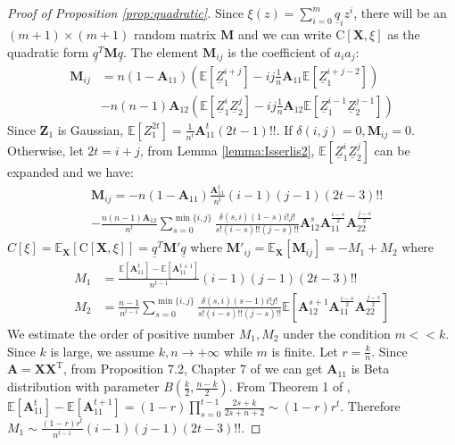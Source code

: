 \documentclass[conference]{IEEEtran}
\def\E{\mathbb{E}}
\def\T{\mathrm{T}}
\begin{document}
\begin{proof}[Proof of Proposition \ref{prop:quadratic}]
Since 
$\xi(z) = \sum_{i=0}^m \underline{q}_i z^i $,
there will be an $(m+1) \times (m+1) $ random matrix $\bm{M}$ and
we can write $\mathrm{C}[\bm{X}, \xi]$
as the quadratic form $ \underline{q}^T \bm{M} \underline{q} $.
The element $\bm{M}_{ij}$ is the coefficient of $a_ia_j$:
\begin{align*}
    \bm{M}_{ij} &= n(1-\bm{A}_{11}) (\E[\underline{Z}_1^{i+j}] -
    ij \frac{1}{n}\bm{A}_{11} \E[\underline{Z}_1^{i+j-2}])  \\
    &-n(n-1)\bm{A}_{12}(\E[\underline{Z}_1^i \underline{Z}_2^j] - ij \frac{1}{n}\bm{A}_{12}\E[\underline{Z}_1^{i-1}\underline{Z}_2^{j-1}])
\end{align*}
Since $\bm{Z}_1$ is Gaussian, $\E[Z_1^{2t}] = \frac{1}{n^t}\bm{A}_{11}^t (2t-1)!!$. If $\delta(i, j) = 0, \bm{M}_{ij}=0$. Otherwise,
let $ 2t = i + j $, from Lemma \ref{lemma:Isserlis2}, $\E[\underline{Z}_1^i \underline{Z}_2^j]$ can be expanded and we have:
\begin{align*}
    &\bm{M}_{ij} = -n(1-\bm{A}_{11}) \frac{\bm{A}_{11}^t}{n^t}(i-1)(j-1)(2t-3)!! \\
    &-\frac{n(n-1)\bm{A}_{12}}{n^t}\sum_{s=0}^{\min\{i,j\}}
    \frac{\delta(s,i)(1-s)i!j!}{s!(i-s)!!(j-s)!!}
    \bm{A}_{12}^s \bm{A}_{11}^{\frac{i - s}{2}}\bm{A}_{22}^{\frac{j - s}{2}}
\end{align*}
$C[\xi] = \E_{\bm{X}}[\mathrm{C}[\bm{X}, \xi]] =  \underline{q}^T \mathbf{M}' \underline{q}$ where $\mathbf{M}'_{ij} = \E_{\bm{X}} [\bm{M}_{ij}] = -M_1 + M_2$
where 
\begin{align*}
    M_1 & =   \frac{\E[\bm{A}_{11}^t]-\E[\bm{A}_{11}^{t+1}]}{n^{t-1}}(i-1)(j-1)(2t-3)!! \\
    M_2 & = \frac{n-1}{n^{t-1}}\sum_{s=0}^{\min\{i,j\}}
    \frac{\delta(s,i)(s-1)i!j!}{s!(i-s)!!(j-s)!!}
    \E[\bm{A}_{12}^{s+1} \bm{A}_{11}^{\frac{i - s}{2}}\bm{A}_{22}^{\frac{j - s}{2}}]
\end{align*}
We estimate the order of positive number $M_1, M_2$ under the condition $ m << k$. Since $k$ is large, we assume $k, n \to +\infty$ while $m$ is finite. Let $ r= \frac{k}{n}$. Since $\bm{A}=\bm{X}\bm{X}^\T$, from Proposition 7.2, Chapter 7 of \cite{eaton1989group} we can get $\bm{A}_{11}$ is Beta distribution with parameter $B(\frac{k}{2}, \frac{n-k}{2})$.
From Theorem 1 of \cite{multivariateBeta},
$\E[\bm{A}_{11}^t]-\E[\bm{A}_{11}^{t+1}] = (1-r)\prod_{s=0}^{t-1} \frac{2s+k}{2s+n+2} \sim (1-r)r^t$. Therefore $M_1 \sim \frac{(1-r)r^t}{n^{t-1}}(i-1)(j-1)(2t-3)!!$.

\end{proof}
\end{document}

